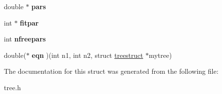 \begin{DoxyCompactItemize}
\item 
\hypertarget{structtreestruct_a9a7049e1db893fda2a8601484d10bb78}{
double $\ast$ {\bfseries pars}}
\label{structtreestruct_a9a7049e1db893fda2a8601484d10bb78}

\item 
\hypertarget{structtreestruct_a7582037133ec06bb54fda78f2a35467e}{
int $\ast$ {\bfseries fitpar}}
\label{structtreestruct_a7582037133ec06bb54fda78f2a35467e}

\item 
\hypertarget{structtreestruct_a65688ba8a1d4073b1d4a594c38015f1c}{
int {\bfseries nfreepars}}
\label{structtreestruct_a65688ba8a1d4073b1d4a594c38015f1c}

\item 
\hypertarget{structtreestruct_ae84230c722737b78bbeea7b666f4ebb8}{
double($\ast$ {\bfseries eqn} )(int n1, int n2, struct \hyperlink{structtreestruct}{treestruct} $\ast$mytree)}
\label{structtreestruct_ae84230c722737b78bbeea7b666f4ebb8}

\end{DoxyCompactItemize}


The documentation for this struct was generated from the following file:\begin{DoxyCompactItemize}
\item 
tree.h\end{DoxyCompactItemize}
